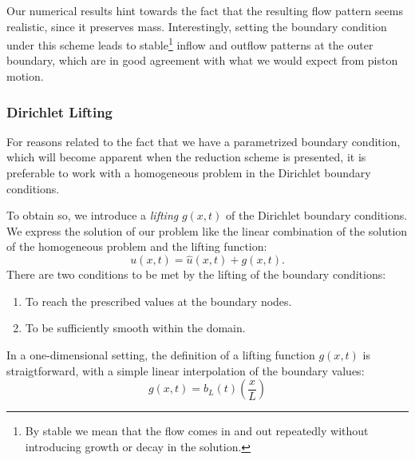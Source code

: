 \documentclass[../../thesis.tex]{subfiles}
\begin{document}
Our numerical results hint towards the fact that the resulting flow pattern seems realistic, 
since it preserves mass.
Interestingly, setting the boundary condition under this scheme 
leads to stable\footnote{
    By stable we mean that the flow comes in and out repeatedly without introducing
    growth or decay in the solution.
}
inflow and outflow patterns at the outer boundary, 
which are in good agreement with what we would expect from piston motion.


\subsubsection{Dirichlet Lifting}
\label{sec:1d_fom_heat_equation_dirichlet_lifting}
For reasons related to the fact that we have a parametrized boundary condition,
which will become apparent when the reduction scheme is presented,
it is preferable to work with a homogeneous problem in the Dirichlet boundary conditions.

To obtain so, we introduce a \emph{lifting} $g(x,t)$ of the Dirichlet boundary conditions.
We express the solution of our problem like the linear combination of the solution of the homogeneous problem and the lifting function:
\begin{equation}
    \label{eq:1d_fom_homogeneous_plus_lifting}
    u(x,t) = \hat{u}(x,t) + g(x,t).
\end{equation}
There are two conditions to be met by the lifting of the boundary conditions:
\begin{enumerate}
    \item To reach the prescribed values at the boundary nodes.
    \item To be sufficiently smooth within the domain.
\end{enumerate}
In a one-dimensional setting, the definition of a lifting function $g(x,t)$ is straigtforward, with a simple linear interpolation of the boundary values:
\begin{equation}
    \label{eq:1d_fom_dirichlet_lifting}
    g(x,t) = b_L(t) \left(\frac{x}{L}\right)
\end{equation}
\end{document}
